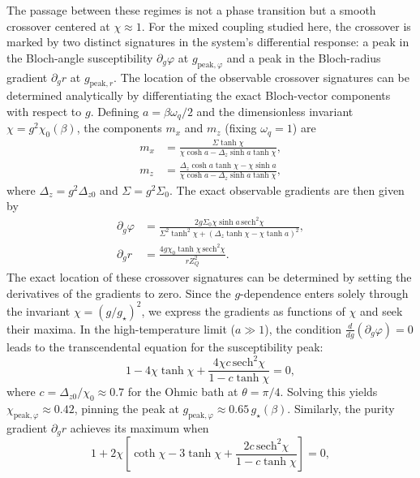 The passage between these regimes is not a phase transition but a smooth
crossover centered at $\chi\approx 1$. For the mixed coupling studied here,
the crossover is marked by two distinct signatures in the system's 
differential response: a peak in the Bloch-angle susceptibility 
$\partial_g\varphi$ at $g_{\mathrm{peak},\varphi}$ and a peak in the 
Bloch-radius gradient $\partial_g r$ at $g_{\mathrm{peak},r}$. 
The location of the observable crossover signatures can be determined 
analytically by differentiating the exact Bloch-vector components 
with respect to $g$. Defining $a = \beta \omega_q / 2$ and the 
dimensionless invariant $\chi = g^2 \chi_0(\beta)$, the components 
$m_x$ and $m_z$ (fixing $\omega_q=1$) are
\begin{align}
  m_x &= \frac{\Sigma \tanh \chi}{\chi \cosh a - \Delta_z \sinh a \tanh \chi}, \\
  m_z &= \frac{\Delta_z \cosh a \tanh \chi - \chi \sinh a}{\chi \cosh a - \Delta_z \sinh a \tanh \chi},
\end{align}
where $\Delta_z = g^2 \Delta_{z0}$ and $\Sigma = g^2 \Sigma_0$. 
The exact observable gradients are then given by
\begin{align}
  \partial_g \varphi &= \frac{2g \Sigma_0 \chi \sinh a\,\mathrm{sech}^2 \chi}{\Sigma^2 \tanh^2 \chi + (\Delta_z \tanh \chi - \chi \tanh a)^2}, 
  \label{eq:dphi_dg_exact} \\
   \partial_g r &= \frac{4g\chi_0 \tanh \chi \,\mathrm{sech}^2 \chi}{r Z_Q^2}.
\end{align}
The exact location of these crossover signatures can be determined by 
setting the derivatives of the gradients to zero. Since the 
$g$-dependence enters solely through the invariant $\chi = (g/g_\star)^2$, 
we express the gradients as functions of $\chi$ and seek their 
maxima. In the high-temperature limit ($a \gg 1$), the condition 
$\frac{d}{dg} (\partial_g \varphi) = 0$ leads to the transcendental 
equation for the susceptibility peak:
\begin{equation}
  1 - 4\chi \tanh \chi + \frac{4\chi c\,\mathrm{sech}^2 \chi}{1 - c\tanh \chi} = 0,
  \label{eq:peak_condition_phi}
\end{equation}
where $c = \Delta_{z0}/\chi_0 \approx 0.7$ for the Ohmic bath at 
$\theta = \pi/4$. Solving this yields $\chi_{\mathrm{peak},\varphi} \approx 0.42$, 
pinning the peak at $g_{\mathrm{peak},\varphi} \approx 0.65\, g_\star(\beta)$. 
Similarly, the purity gradient $\partial_g r$ achieves its maximum when
\begin{equation}
  1 + 2\chi \left[ \coth \chi - 3\tanh \chi + \frac{2c\,\mathrm{sech}^2 \chi}{1 - c\tanh \chi} \right] = 0,
\end{equation}
